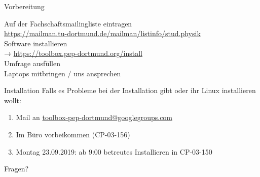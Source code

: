 \begin{frame}{Vorbereitung}
  \begin{center}
    \huge
    Auf der Fachschaftsmailingliste eintragen \\
    \url{https://mailman.tu-dortmund.de/mailman/listinfo/stud.physik}\\[0.5\baselineskip]
    Software installieren\\
    → \textcolor{blue!70!black}{\url{https://toolbox.pep-dortmund.org/install}}\\[0.5\baselineskip]
    Umfrage ausfüllen\\[0.5\baselineskip]
    Laptops mitbringen / uns ansprechen
  \end{center}
\end{frame}
\begin{frame}{Installation}
  \huge
  Falls es Probleme bei der Installation gibt oder ihr Linux installieren wollt:\\[0.5\baselineskip]
  \begin{enumerate}
    \item Mail an \href{mailto:toolbox-pep-dortmund@googlegroups.com}{toolbox-pep-dortmund@googlegroups.com}
    \item Im Büro vorbeikommen (CP-03-156)
    \item Montag 23.09.2019: ab 9:00 betreutes Installieren in CP-03-150
  \end{enumerate}
\end{frame}
\begin{frame}
  \Huge\centering
  \textcolor{red!70!black}{Fragen?}
\end{frame}

